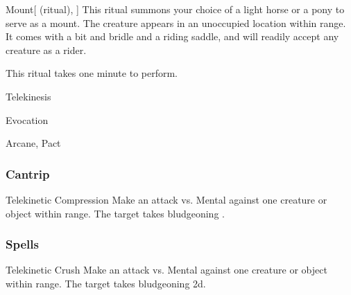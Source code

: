 \lowercase{\hypertarget{spell:Mount}{}}\label{spell:Mount}
\begin{attuneability}[\nth{2}]{\hypertarget{spell:Mount}{Mount}}[ (ritual), ]
This ritual summons your choice of a light horse or a pony to serve as a mount.
The creature appears in an unoccupied location within \rngclose range.
It comes with a bit and bridle and a riding saddle, and will readily accept any creature as a rider.

This ritual takes one minute to perform.
\end{attuneability}
\vspace{0.25em}


\newpage
\begin{spellsection}{Telekinesis}

\begin{spellheader}
\end{spellheader}


 Evocation

 Arcane, Pact

\subsubsection{Cantrip}


\begin{freeability}{Telekinetic Compression}
Make an attack vs. Mental against one creature or object within \rngmed range.
\hit The target takes bludgeoning .
\end{freeability}

\end{spellsection}


\subsubsection{Spells}


\lowercase{\hypertarget{spell:Telekinetic Crush}{}}\label{spell:Telekinetic Crush}
\begin{apability}[\nth{1}]{\hypertarget{spell:Telekinetic Crush}{Telekinetic Crush}}
Make an attack vs. Mental against one creature or object within \rngmed range.
\hit The target takes bludgeoning  \plus2d.
\end{apability}
\vspace{0.25em}




